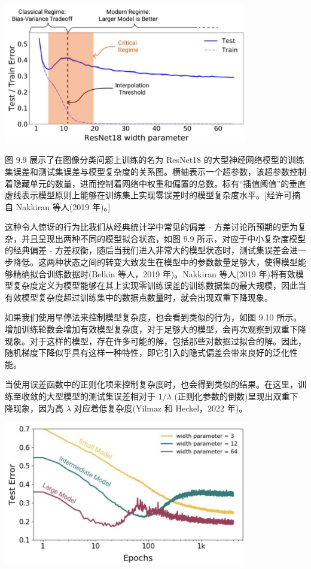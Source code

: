 \documentclass[10pt]{article}
\begin{document}
\begin{center}
\includegraphics[max width=0.8\textwidth]{images/0194e279-9b28-703a-88f4-c3ac21e2010d_288_361_356_1087_623_0.jpg}
\end{center}
\hspace*{3em} 

图 9.9 展示了在图像分类问题上训练的名为 ResNet18 的大型神经网络模型的训练集误差和测试集误差与模型复杂度的关系图。横轴表示一个超参数，该超参数控制着隐藏单元的数量，进而控制着网络中权重和偏置的总数。标有“插值阈值”的垂直虚线表示模型原则上能够在训练集上实现零误差时的模型复杂度水平。[经许可摘自 Nakkiran 等人(2019 年)。]

这种令人惊讶的行为比我们从经典统计学中常见的偏差 - 方差讨论所预期的更为复杂，并且呈现出两种不同的模型拟合状态，如图 9.9 所示，对应于中小复杂度模型的经典偏差 - 方差权衡，随后当我们进入非常大的模型状态时，测试集误差会进一步降低。这两种状态之间的转变大致发生在模型中的参数数量足够大，使得模型能够精确拟合训练数据时(Belkin 等人，2019 年)。Nakkiran 等人(2019 年)将有效模型复杂度定义为模型能够在其上实现零训练误差的训练数据集的最大规模，因此当有效模型复杂度超过训练集中的数据点数量时，就会出现双重下降现象。

如果我们使用早停法来控制模型复杂度，也会看到类似的行为，如图 9.10 所示。增加训练轮数会增加有效模型复杂度，对于足够大的模型，会再次观察到双重下降现象。对于这样的模型，存在许多可能的解，包括那些对数据过拟合的解。因此，随机梯度下降似乎具有这样一种特性，即它引入的隐式偏差会带来良好的泛化性能。

当使用误差函数中的正则化项来控制复杂度时，也会得到类似的结果。在这里，训练至收敛的大型模型的测试集误差相对于 \(1/\lambda\) (正则化参数的倒数)呈现出双重下降现象，因为高 \(\lambda\) 对应着低复杂度(Yilmaz 和 Heckel，2022 年)。

\begin{center}
\includegraphics[max width=0.8\textwidth]{images/0194e279-9b28-703a-88f4-c3ac21e2010d_289_397_354_998_585_0.jpg}
\end{center}
\hspace*{3em} 
\end{document}
